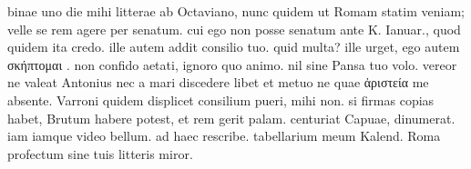 


 binae uno die mihi litterae ab Octaviano, nunc quidem ut Romam statim veniam; velle se rem agere per senatum. cui ego non posse senatum ante K. Ianuar., quod quidem ita credo. ille autem addit consilio tuo. quid multa? ille urget, ego autem σκήπτομαι . non confido aetati, ignoro quo animo. nil sine Pansa tuo volo. vereor ne valeat Antonius nec a mari discedere libet et metuo ne quae ἀριστεία me absente. Varroni quidem displicet consilium pueri, mihi non. si firmas copias habet, Brutum habere potest, et rem gerit palam. centuriat Capuae, dinumerat. iam iamque video bellum. ad haec rescribe. tabellarium meum Kalend. Roma profectum sine tuis litteris miror.
